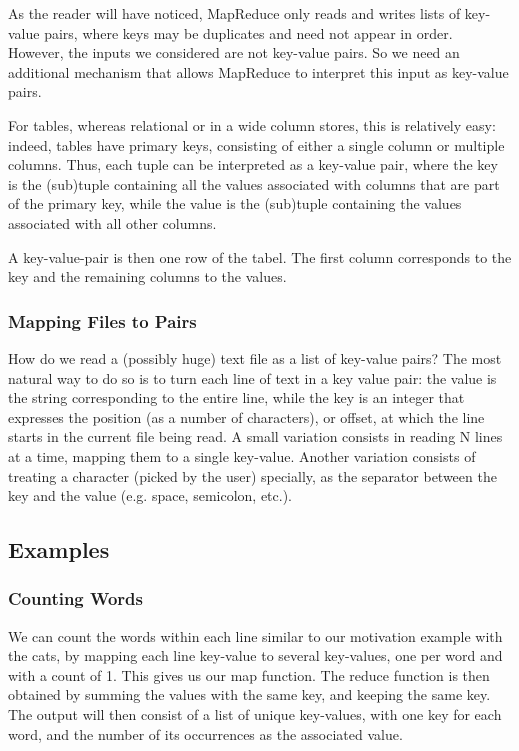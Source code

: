 As the reader will have noticed, MapReduce only reads and writes lists of key-value pairs, where keys may be duplicates and need not appear in order. However, the inputs we considered are not key-value pairs. So we need an additional mechanism that allows MapReduce to interpret this input as key-value pairs.

For tables, whereas relational or in a wide column stores, this is relatively easy: indeed, tables have primary keys, consisting of either a single column or multiple columns. Thus, each tuple can be interpreted as a key-value pair, where the key is the (sub)tuple containing all the values associated with columns that are part of the primary key, while the value is the (sub)tuple containing the values associated with all other columns.

A key-value-pair is then one row of the tabel. The first column corresponds to the key and the remaining columns to the values.

\subsubsection{Mapping Files to Pairs}

How do we read a (possibly huge) text file as a list of key-value pairs? The most natural way to do so is to turn each line of text in a key value pair: the value is the string corresponding to the entire line, while the key is an integer that expresses the position (as a number of characters), or offset, at which the line starts in the current file being read. A small variation consists in reading N lines at a time, mapping them to a single key-value. Another variation consists of treating a character (picked by the user) specially, as the separator between the key and the value (e.g. space, semicolon, etc.).


\subsection{Examples}

\subsubsection{Counting Words}

We can count the words within each line similar to our motivation example with the cats, by mapping each line key-value to several key-values, one per word and with a count of 1. This gives us our map function. The reduce function is then obtained by summing the values with the same key, and keeping the same key. The output will then consist of a list of unique key-values, with one key for each word, and the number of its occurrences as the associated value.

